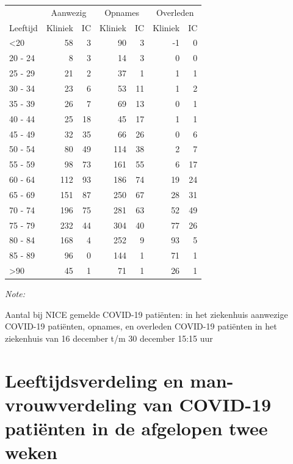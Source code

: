 \documentclass[
  english,
  man,floatsintext]{apa6}
\begin{document}
\begin{table}
\centering\begingroup\fontsize{10}{12}\selectfont

\begin{threeparttable}
\begin{tabular}{lrrrrrr}
\toprule
\multicolumn{1}{c}{ } & \multicolumn{2}{c}{Aanwezig} & \multicolumn{2}{c}{Opnames} & \multicolumn{2}{c}{Overleden} \\
\cmidrule(l{3pt}r{3pt}){2-3} \cmidrule(l{3pt}r{3pt}){4-5} \cmidrule(l{3pt}r{3pt}){6-7}
Leeftijd & Kliniek & IC & Kliniek & IC & Kliniek & IC\\
\midrule
<20 & 58 & 3 & 90 & 3 & -1 & 0\\
20 - 24 & 8 & 3 & 14 & 3 & 0 & 0\\
25 - 29 & 21 & 2 & 37 & 1 & 1 & 1\\
30 - 34 & 23 & 6 & 53 & 11 & 1 & 2\\
35 - 39 & 26 & 7 & 69 & 13 & 0 & 1\\
40 - 44 & 25 & 18 & 45 & 17 & 1 & 1\\
45 - 49 & 32 & 35 & 66 & 26 & 0 & 6\\
50 - 54 & 80 & 49 & 114 & 38 & 2 & 7\\
55 - 59 & 98 & 73 & 161 & 55 & 6 & 17\\
60 - 64 & 112 & 93 & 186 & 74 & 19 & 24\\
65 - 69 & 151 & 87 & 250 & 67 & 28 & 31\\
70 - 74 & 196 & 75 & 281 & 63 & 52 & 49\\
75 - 79 & 232 & 44 & 304 & 40 & 77 & 26\\
80 - 84 & 168 & 4 & 252 & 9 & 93 & 5\\
85 - 89 & 96 & 0 & 144 & 1 & 71 & 1\\
>90 & 45 & 1 & 71 & 1 & 26 & 1\\
\bottomrule
\end{tabular}
\begin{tablenotes}
\item \textit{Note: } 
\item Aantal bij NICE gemelde COVID-19 patiënten: in het ziekenhuis aanwezige COVID-19 patiënten, opnames, en overleden COVID-19 patiënten in het ziekenhuis van 16 december t/m 30 december 15:15 uur
\end{tablenotes}
\end{threeparttable}
\endgroup{}
\end{table}

\newpage

\hypertarget{leeftijdsverdeling-en-man-vrouwverdeling-van-covid-19-patiuxebnten-in-de-afgelopen-twee-weken}{%
\section{Leeftijdsverdeling en man-vrouwverdeling van COVID-19 patiënten in de afgelopen twee weken}\label{leeftijdsverdeling-en-man-vrouwverdeling-van-covid-19-patiuxebnten-in-de-afgelopen-twee-weken}}
\end{document}
